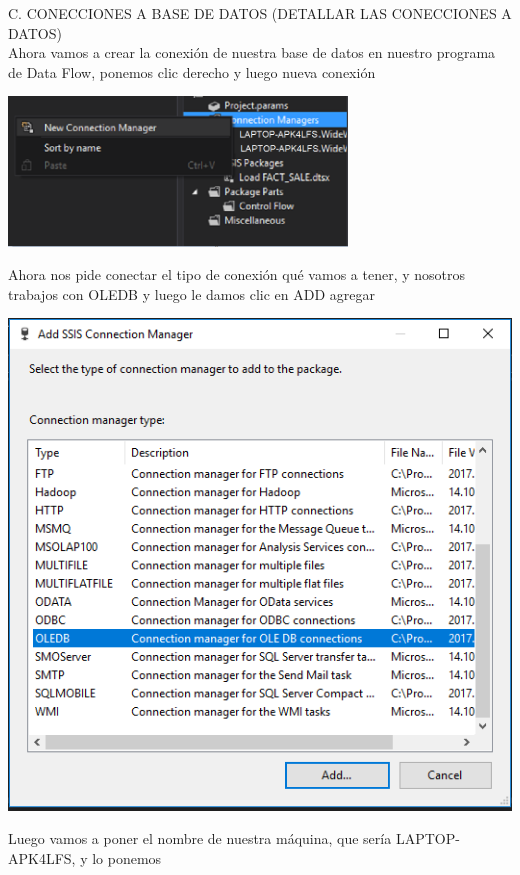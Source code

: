 \documentclass[12pt,letterpaper]{article}
\begin{document}
C.	CONECCIONES A BASE DE DATOS (DETALLAR LAS CONECCIONES A DATOS)\\


Ahora vamos a crear la conexi\'on de nuestra base de datos en nuestro programa de Data Flow, ponemos clic derecho y luego nueva conexi\'on\\
\begin{center}
\includegraphics[width=9cm]{IMG/27.png} 
\end{center}

Ahora nos pide conectar el tipo de conexi\'on qu\'e vamos a tener, y nosotros trabajos con OLEDB y luego le damos clic en ADD agregar\\
\begin{center}
\includegraphics[width=17cm]{IMG/28.png} 
\end{center}

Luego vamos a poner el nombre de nuestra m\'aquina, que sería LAPTOP-APK4LFS, y lo ponemos\\
\end{document}
